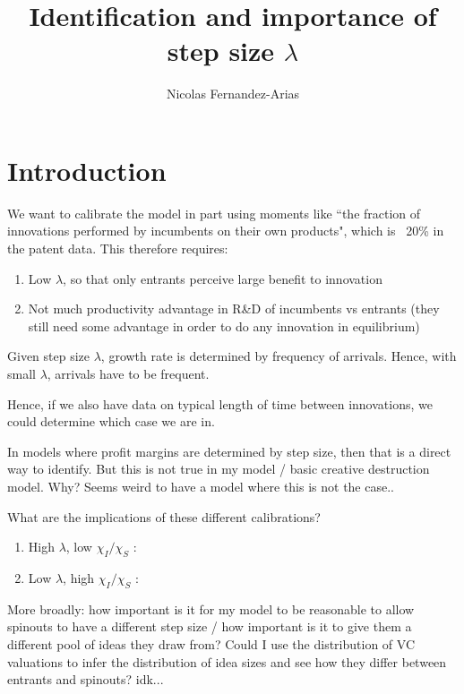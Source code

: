 \documentclass[11pt,english]{article}
\theoremstyle{remark}
\begin{document}
	
\title{Identification and importance of step size $\lambda$}
\author{Nicolas Fernandez-Arias}
\maketitle

\section{Introduction}

We want to calibrate the model in part using moments like ``the fraction of innovations performed by incumbents on their own products", which is ~20\% in the patent data. This therefore requires:

\begin{enumerate}
	\item Low $\lambda$, so that only entrants perceive large benefit to innovation
	\item Not much productivity advantage in R\&D of incumbents vs entrants (they still need some advantage in order to do any innovation in equilibrium)
\end{enumerate}

Given step size $\lambda$, growth rate is determined by frequency of arrivals. Hence, with small $\lambda$, arrivals have to be frequent. 

Hence, if we also have data on typical length of time between innovations, we could determine which case we are in.

In models where profit margins are determined by step size, then that is a direct way to identify. But this is not true in my model / basic creative destruction model. Why? Seems weird to have a model where this is not the case..

What are the implications of these different calibrations? 
\begin{enumerate}
	\item High $\lambda$, low $\chi_I / \chi_S$ : 
	\item Low $\lambda$, high $\chi_I / \chi_S$ : 
\end{enumerate}

More broadly: how important is it for my model to be reasonable to allow spinouts to have a different step size / how important is it to give them a different pool of ideas they draw from? Could I use the distribution of VC valuations to infer the distribution of idea sizes and see how they differ between entrants and spinouts? idk...








 
\end{document}
